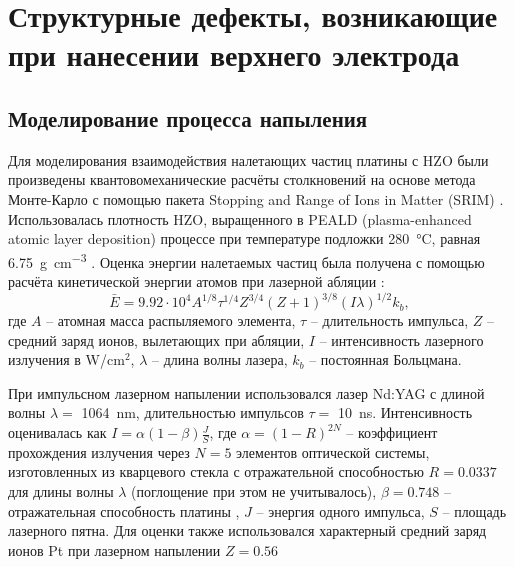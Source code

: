 \chapter{Структурные дефекты, возникающие при нанесении верхнего электрода}\label{ch:ch3}
\section{Моделирование процесса напыления}\label{sec:ch3/sec2}
Для моделирования взаимодействия налетающих частиц платины с HZO были произведены квантовомеханические расчёты столкновений на основе метода Монте-Карло с помощью пакета Stopping and Range of Ions in Matter (SRIM) \cite{zieglerSRIMStoppingRange2010}. Использовалась плотность HZO, выращенного в PEALD (plasma-enhanced atomic layer deposition) процессе при температуре подложки \SI{280}{\degreeCelsius}, равная \SI{6.75}{\gram\per\cm\cubed} \cite{kimEffectProcessTemperature2022}. Оценка энергии налетаемых частиц была получена с помощью расчёта кинетической энергии атомов при лазерной абляции \cite{mutaevVLIYaNIEVERHNEYGRANICY2020}:
\[\bar{E} = 9.92 \cdot 10^{4} A^{1/8} \tau^{1/4} Z^{3/4} (Z+1)^{3/8} (I\lambda)^{1/2}k_b,\] где \(A\) -- атомная масса распыляемого элемента, \(\tau\) -- длительность импульса, \(Z\) -- средний заряд ионов, вылетающих при абляции, \(I\) -- интенсивность лазерного излучения в \si{\watt}/\si{\cm}\(^2\), \(\lambda\) -- длина волны лазера, \(k_b\) -- постоянная Больцмана.

При импульсном лазерном напылении использовался лазер Nd:YAG с длиной волны \(\lambda=\) \SI{1064}{\nano\meter}, длительностью импульсов \(\tau=\) \SI{10}{\nano\second}. Интенсивность оценивалась как \(I=\alpha(1-\beta)\frac{J}{S}\), где \(\alpha=(1-R)^{2N}\) -- коэффициент прохождения излучения через \(N=5\) элементов оптической системы, изготовленных из кварцевого стекла с отражательной способностью \(R=0.0337\) \cite{polyanskiyRefractiveindexInfoDatabase2024} для длины волны \(\lambda\) (поглощение при этом не учитывалось), \(\beta=0.748\) -- отражательная способность платины \cite{weberHandbookOpticalMaterials2003}, \(J\) -- энергия одного импульса, \(S\) -- площадь лазерного пятна. Для оценки также использовался характерный средний заряд ионов Pt при лазерном напылении $Z=0.56$ \cite[с.~141]{easonPulsedLaserDeposition2007}

